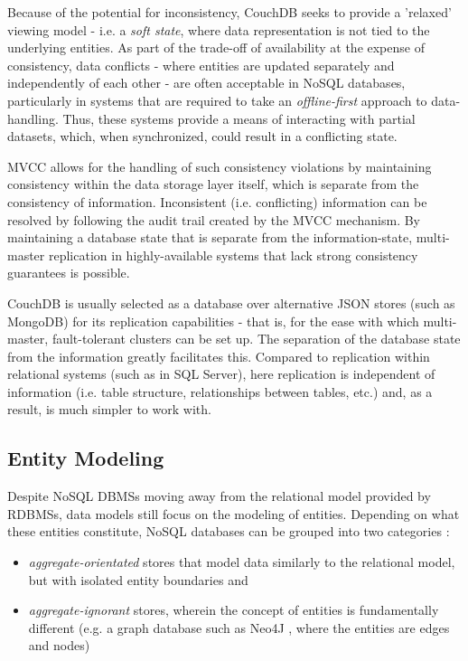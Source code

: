 Because of the potential for inconsistency, CouchDB seeks to provide a 'relaxed' viewing model - i.e. a \textit{soft state}, where data representation is not tied to the underlying entities. As part of the trade-off of availability at the expense of consistency, data conflicts - where entities are updated separately and independently of each other - are often acceptable in NoSQL databases, particularly in systems that are required to take an \textit{offline-first} approach to data-handling. Thus, these systems provide a means of interacting with partial datasets, which, when synchronized, could result in a conflicting state.

MVCC allows for the handling of such consistency violations by maintaining consistency within the data storage layer itself, which is separate from the consistency of information. Inconsistent (i.e. conflicting) information can be resolved by following the audit trail created by the MVCC mechanism. By maintaining a database state that is separate from the information-state, multi-master replication in highly-available systems that lack strong consistency guarantees is possible.

CouchDB is usually selected as a database over alternative JSON stores (such as MongoDB) for its replication capabilities - that is, for the ease with which multi-master, fault-tolerant clusters can be set up. The separation of the database state from the information greatly facilitates this. Compared to replication within relational systems (such as in SQL Server), here replication is independent of information (i.e. table structure, relationships between tables, etc.) and, as a result, is much simpler to work with.

\subsection{Entity Modeling}
Despite NoSQL DBMSs moving away from the relational model provided by RDBMSs, data models still focus on the modeling of entities. Depending on what these entities constitute, NoSQL databases can be grouped into two categories \cite{fowlerAggregate}:

\begin{itemize}
    \item \textit{aggregate-orientated} stores that model data similarly to the relational model, but with isolated entity boundaries and
    \item \textit{aggregate-ignorant} stores, wherein the concept of entities is fundamentally different (e.g. a graph database such as Neo4J \cite{sadalage2012}, where the entities are edges and nodes)
\end{itemize}


